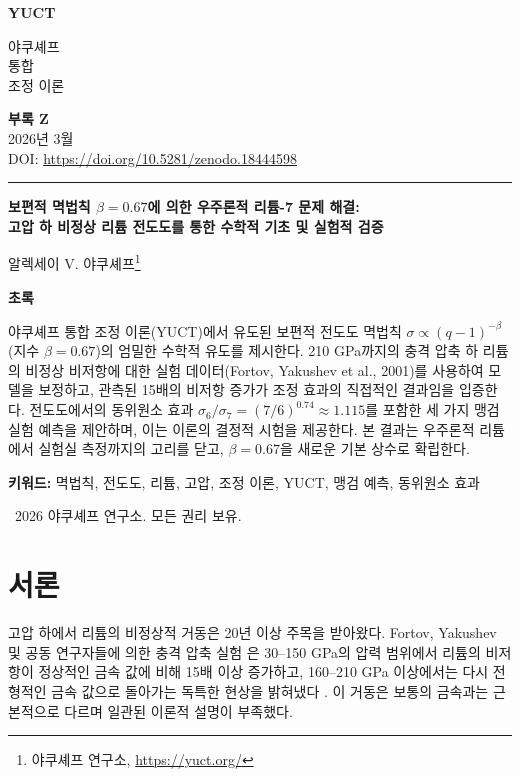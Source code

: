 \documentclass[11pt,a4paper]{article}
\theoremstyle{remark}
\newcommand{\makeheader}{%
	\noindent
	\begin{minipage}{0.17\textwidth}
		\raggedright
		{\sffamily\bfseries\color{skyblue}\fontsize{46}{46}\selectfont YUCT}%
	\end{minipage}%
	\hspace{30pt}
	\begin{minipage}{0.32\textwidth}
		\raggedright
		{\sffamily\fontsize{11}{13}\selectfont 야쿠셰프\\ 통합\\ 조정 이론}%
	\end{minipage}%
	\hfill
	\begin{minipage}{0.38\textwidth}
		\raggedleft
		{\sffamily\bfseries 부록 Z}\\
		{\sffamily 2026년 3월}\\
		{\sffamily\footnotesize DOI: \url{https://doi.org/10.5281/zenodo.18444598}}%
	\end{minipage}
	\par\vspace{5pt}
	\noindent\textcolor{gold}{\rule{\textwidth}{1.6pt}}
	\par\vspace{0pt}
}
\begin{document}
	\renewcommand{\thepage}{\arabic{page}}
	\thispagestyle{firstpage}
	\makeheader
	
	\vspace{0cm}
	{\LARGE\bfseries 보편적 멱법칙 \(\beta = 0.67\)에 의한 우주론적 리튬-7 문제 해결: \\
		고압 하 비정상 리튬 전도도를 통한 수학적 기초 및 실험적 검증 \par}
	\vspace{0.2cm}
	
	{\large 알렉세이 V. 야쿠셰프\footnote{야쿠셰프 연구소, \url{https://yuct.org/}}} \\
	\vspace{0.0cm}
	
	{\color{darkblue}\textbf{\LARGE 초록}} \par
	{\large
		\noindent
		야쿠셰프 통합 조정 이론(YUCT)에서 유도된 보편적 전도도 멱법칙 \(\sigma \propto (q-1)^{-\beta}\) (지수 \(\beta = 0.67\))의 엄밀한 수학적 유도를 제시한다. 210 GPa까지의 충격 압축 하 리튬의 비정상 비저항에 대한 실험 데이터(Fortov, Yakushev et al., 2001)를 사용하여 모델을 보정하고, 관측된 15배의 비저항 증가가 조정 효과의 직접적인 결과임을 입증한다. 전도도에서의 동위원소 효과 \(\sigma_6/\sigma_7 = (7/6)^{0.74} \approx 1.115\)를 포함한 세 가지 맹검 실험 예측을 제안하며, 이는 이론의 결정적 시험을 제공한다. 본 결과는 우주론적 리튬에서 실험실 측정까지의 고리를 닫고, \(\beta = 0.67\)을 새로운 기본 상수로 확립한다.
	}
	
	\vspace{0.1cm}
	\noindent
	{\color{darkblue}\textbf{키워드:}} 멱법칙, 전도도, 리튬, 고압, 조정 이론, YUCT, 맹검 예측, 동위원소 효과
	
	\vspace{0.5cm}
	\noindent
	\textcopyright\ 2026 야쿠셰프 연구소. 모든 권리 보유.
	
	\tableofcontents
	\newpage
	
	\section{서론}
	
	고압 하에서 리튬의 비정상적 거동은 20년 이상 주목을 받아왔다. Fortov, Yakushev 및 공동 연구자들에 의한 충격 압축 실험 \cite{fortov2001, yakushev2002, fortov1999}은 30–150 GPa의 압력 범위에서 리튬의 비저항이 정상적인 금속 값에 비해 15배 이상 증가하고, 160–210 GPa 이상에서는 다시 전형적인 금속 값으로 돌아가는 독특한 현상을 밝혀냈다 \cite{fortov2001, yakushev2002}. 이 거동은 보통의 금속과는 근본적으로 다르며 일관된 이론적 설명이 부족했다.
	
\end{document}
